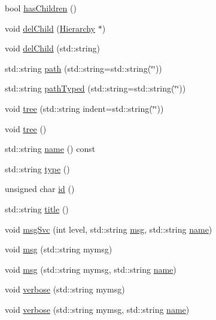 \begin{DoxyCompactItemize}
bool \hyperlink{classHierarchy_a255174fe4d316d2a3f430dcb9dab29f1}{has\+Children} ()
\item 
void \hyperlink{classHierarchy_a2b2b359fac003233f65786a616766bde}{del\+Child} (\hyperlink{classHierarchy}{Hierarchy} $\ast$)
\item 
void \hyperlink{classHierarchy_a1928ac7615fe0b5e55cd707f70dc6781}{del\+Child} (std\+::string)
\item 
std\+::string \hyperlink{classHierarchy_aa7990fa7caf132d83e361ce033c6c65a}{path} (std\+::string=std\+::string(\char`\"{}\char`\"{}))
\item 
std\+::string \hyperlink{classHierarchy_a1efd56cd164d328d2002e53a10a19b8c}{path\+Typed} (std\+::string=std\+::string(\char`\"{}\char`\"{}))
\item 
void \hyperlink{classHierarchy_a76e914b9a677a22a82deb74d892bf261}{tree} (std\+::string indent=std\+::string(\char`\"{}\char`\"{}))
\item 
void \hyperlink{classHierarchy_a594c294c5f60c230e106d522ed008212}{tree} ()
\item 
std\+::string \hyperlink{classObject_a300f4c05dd468c7bb8b3c968868443c1}{name} () const
\item 
std\+::string \hyperlink{classObject_a84f99f70f144a83e1582d1d0f84e4e62}{type} ()
\item 
unsigned char \hyperlink{classObject_af99145335cc61ff6e2798ea17db009d2}{id} ()
\item 
std\+::string \hyperlink{classObject_a73a0f1a41828fdd8303dd662446fb6c3}{title} ()
\item 
void \hyperlink{classObject_a3f9d5537ebce0c0f2bf6ae4d92426f3c}{msg\+Svc} (int level, std\+::string \hyperlink{classObject_a58b2d0618c2d08cf2383012611528d97}{msg}, std\+::string \hyperlink{classObject_a300f4c05dd468c7bb8b3c968868443c1}{name})
\item 
void \hyperlink{classObject_a58b2d0618c2d08cf2383012611528d97}{msg} (std\+::string mymsg)
\item 
void \hyperlink{classObject_ac5d59299273cee27aacf7de00d2e7034}{msg} (std\+::string mymsg, std\+::string \hyperlink{classObject_a300f4c05dd468c7bb8b3c968868443c1}{name})
\item 
void \hyperlink{classObject_a83d2db2df682907ea1115ad721c1c4a1}{verbose} (std\+::string mymsg)
\item 
void \hyperlink{classObject_a2d4120195317e2a3c6532e8bb9f3da68}{verbose} (std\+::string mymsg, std\+::string \hyperlink{classObject_a300f4c05dd468c7bb8b3c968868443c1}{name})
\item 

\end{DoxyCompactItemize}
